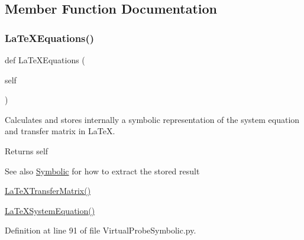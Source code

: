 \subsection{Member Function Documentation}
\mbox{\label{classSignalIntegrity_1_1SystemDescriptions_1_1VirtualProbeSymbolic_1_1VirtualProbeSymbolic_a3f6cd3290ceb07e8985e1eb832be3934}} 
\subsubsection{\texorpdfstring{La\+Te\+X\+Equations()}{LaTeXEquations()}}
{\footnotesize\ttfamily def La\+Te\+X\+Equations (\begin{DoxyParamCaption}\item[{}]{self }\end{DoxyParamCaption})}



Calculates and stores internally a symbolic representation of the system equation and transfer matrix in La\+TeX. 

\begin{DoxyReturn}{Returns}
self 
\end{DoxyReturn}
\begin{DoxySeeAlso}{See also}
\hyperlink{namespaceSignalIntegrity_1_1SystemDescriptions_1_1Symbolic}{Symbolic} for how to extract the stored result 

\hyperlink{classSignalIntegrity_1_1SystemDescriptions_1_1VirtualProbeSymbolic_1_1VirtualProbeSymbolic_adc83c150e43916083e3379cd4b9bb80e}{La\+Te\+X\+Transfer\+Matrix()} 

\hyperlink{classSignalIntegrity_1_1SystemDescriptions_1_1SystemDescriptionSymbolic_1_1SystemDescriptionSymbolic_ab91378c2a97ec0d38ee1c70988142eb5}{La\+Te\+X\+System\+Equation()} 
\end{DoxySeeAlso}


Definition at line 91 of file Virtual\+Probe\+Symbolic.\+py.


